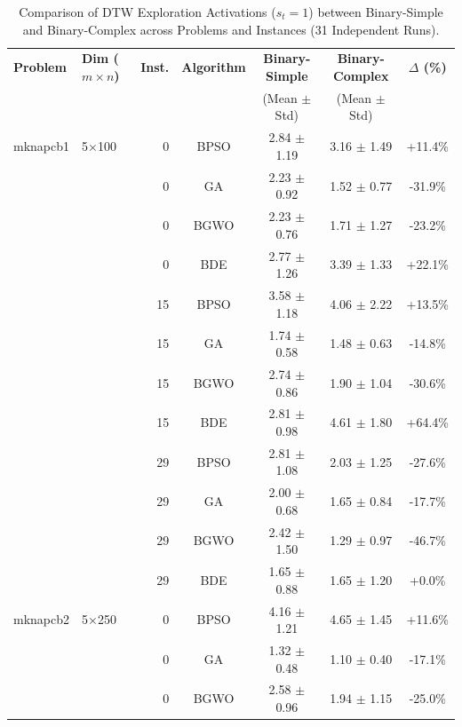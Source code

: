 \begin{table}[htbp]
\centering
\small
\caption{Comparison of DTW Exploration Activations ($s_t = 1$) between Binary-Simple and Binary-Complex across Problems and Instances (31 Independent Runs).}
\label{tab:dtw_activations}
\begin{tabular}{llrcccc}
\toprule
\textbf{Problem} & \textbf{Dim ($m \times n$)} & \textbf{Inst.} & \textbf{Algorithm} & \textbf{Binary-Simple} & \textbf{Binary-Complex} & \textbf{$\Delta$ (\%)} \\
 & & & & (Mean $\pm$ Std) & (Mean $\pm$ Std) & \\
\midrule
mknapcb1     & 5×100    & 0 & BPSO  & 2.84 $\pm$ 1.19    & 3.16 $\pm$ 1.49    & +11.4\% \\
             &          & 0 & GA    & 2.23 $\pm$ 0.92    & 1.52 $\pm$ 0.77    & -31.9\% \\
             &          & 0 & BGWO  & 2.23 $\pm$ 0.76    & 1.71 $\pm$ 1.27    & -23.2\% \\
             &          & 0 & BDE   & 2.77 $\pm$ 1.26    & 3.39 $\pm$ 1.33    & +22.1\% \\
             &          & 15 & BPSO  & 3.58 $\pm$ 1.18    & 4.06 $\pm$ 2.22    & +13.5\% \\
             &          & 15 & GA    & 1.74 $\pm$ 0.58    & 1.48 $\pm$ 0.63    & -14.8\% \\
             &          & 15 & BGWO  & 2.74 $\pm$ 0.86    & 1.90 $\pm$ 1.04    & -30.6\% \\
             &          & 15 & BDE   & 2.81 $\pm$ 0.98    & 4.61 $\pm$ 1.80    & +64.4\% \\
             &          & 29 & BPSO  & 2.81 $\pm$ 1.08    & 2.03 $\pm$ 1.25    & -27.6\% \\
             &          & 29 & GA    & 2.00 $\pm$ 0.68    & 1.65 $\pm$ 0.84    & -17.7\% \\
             &          & 29 & BGWO  & 2.42 $\pm$ 1.50    & 1.29 $\pm$ 0.97    & -46.7\% \\
             &          & 29 & BDE   & 1.65 $\pm$ 0.88    & 1.65 $\pm$ 1.20    & +0.0\% \\
mknapcb2     & 5×250    & 0 & BPSO  & 4.16 $\pm$ 1.21    & 4.65 $\pm$ 1.45    & +11.6\% \\
             &          & 0 & GA    & 1.32 $\pm$ 0.48    & 1.10 $\pm$ 0.40    & -17.1\% \\
             &          & 0 & BGWO  & 2.58 $\pm$ 0.96    & 1.94 $\pm$ 1.15    & -25.0\% \\

\end{tabular}
\end{table}
